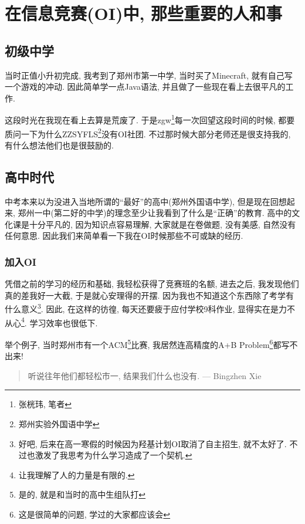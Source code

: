     \section{在信息竞赛(OI)中, 那些重要的人和事}

    \subsection{初级中学}

    当时正值小升初完成, 我考到了郑州市第一中学, 当时买了Minecraft, 就有自己写一个游戏的冲动. 因此简单学一点Java语法, 并且做了一些现在看上去很平凡的工作. 

    这段时光在我现在看上去算是荒废了. 于是zgw\footnote{张桄玮, 笔者}每一次回望这段时间的时候, 都要质问一下为什么ZZSYFLS\footnote{郑州实验外国语中学}没有OI社团. 不过那时候大部分老师还是很支持我的, 有什么想法他们也是很鼓励的. 

    \subsection{高中时代}

    中考本来以为没进入当地所谓的``最好''的高中(郑州外国语中学), 但是现在回想起来, 郑州一中(第二好的中学)的理念至少让我看到了什么是``正确''的教育. 高中的文化课是十分平凡的, 因为知识点容易理解, 大家就是在卷做题, 没有美感, 自然没有任何意思. 因此我们来简单看一下我在OI时候那些不可或缺的经历. 

    \subsubsection{加入OI}

    凭借之前的学习的经历和基础, 我轻松获得了竞赛班的名额, 进去之后, 我发现他们真的差我好一大截, 于是就心安理得的开摆. 因为我也不知道这个东西除了考学有什么意义\footnote{好吧, 后来在高一寒假的时候因为羟基计划OI取消了自主招生, 就不太好了. 不过也激发了我思考为什么学习造成了一个契机.}. 因此, 在这样的彷徨, 每天还要疲于应付学校9科作业, 显得实在是力不从心\footnote{让我理解了人的力量是有限的. }. 学习效率也很低下.

    举个例子, 当时郑州市有一个ACM\footnote{是的, 就是和当时的高中生组队打}比赛, 我居然连高精度的A+B Problem\footnote{这是很简单的问题, 学过的大家都应该会}都写不出来! 

    \begin{quote}
        听说往年他们都轻松市一, 结果我们什么也没有. \hfill --- Bingzhen Xie
    \end{quote}

